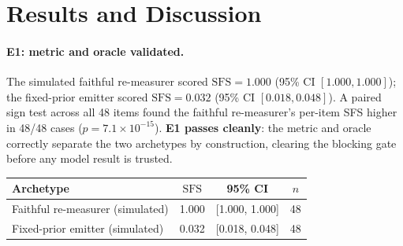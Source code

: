 \documentclass[11pt]{article}
\newcommand{\sfs}{\mathrm{SFS}}
\begin{document}
\section{Results and Discussion}
\label{sec:results}

\paragraph{E1: metric and oracle validated.} The simulated faithful re-measurer
scored $\sfs = 1.000$ (95\% CI $[1.000, 1.000]$); the fixed-prior emitter scored
$\sfs = 0.032$ (95\% CI $[0.018, 0.048]$). A paired sign test across all 48
items found the faithful re-measurer's per-item SFS higher in 48/48 cases
($p = 7.1\times10^{-15}$). \textbf{E1 passes cleanly}: the metric and oracle
correctly separate the two archetypes by construction, clearing the blocking
gate before any model result is trusted.

\begin{center}
\small
\begin{tabular}{lccc}
\toprule
\textbf{Archetype} & $\sfs$ & 95\% CI & $n$ \\
\midrule
Faithful re-measurer (simulated) & 1.000 & [1.000, 1.000] & 48 \\
Fixed-prior emitter (simulated)  & 0.032 & [0.018, 0.048] & 48 \\
\bottomrule
\end{tabular}
\label{tab:e1}
\end{center}
\end{document}
